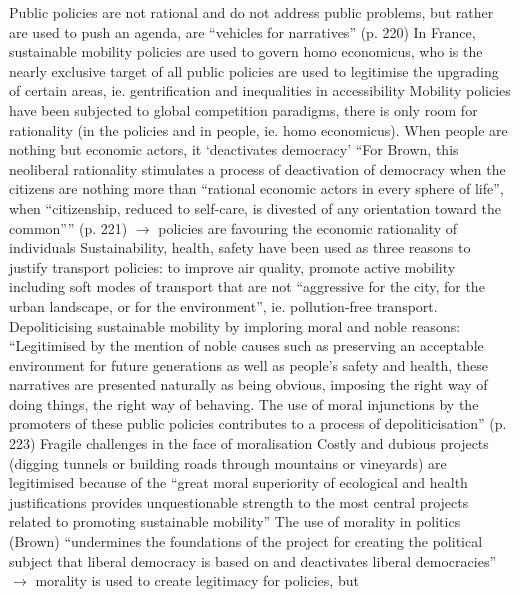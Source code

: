 \documentclass{article}
\begin{document}
\begin{outline}
	\1 Public policies are not rational and do not address public problems, but rather are used to push an agenda, are ``vehicles for narratives'' (p. 220)
	\1 In France, sustainable mobility policies
		\2 are used to govern homo economicus, who is the nearly exclusive target of all public policies
		\2 are used to legitimise the upgrading of certain areas, ie. gentrification and inequalities in accessibility 
	\1 Mobility policies have been subjected to global competition paradigms, there is only room for rationality (in the policies and in people, ie. homo economicus). When people are nothing but economic actors, it `deactivates democracy' 
		\2 ``For Brown, this neoliberal rationality stimulates a process of deactivation of democracy when the citizens are nothing more than ``rational economic actors in every sphere of life'', when ``citizenship, reduced to self-care, is divested of any orientation toward the common'''' (p. 221)
		\2 $\rightarrow$ policies are favouring the economic rationality of individuals
	\1 Sustainability, health, safety have been used as three reasons to justify transport policies: to improve air quality, promote active mobility including soft modes of transport that are not ``aggressive for the city, for the urban landscape, or for the environment'', ie. pollution-free transport.
		\2 Depoliticising sustainable mobility by imploring moral and noble reasons: ``Legitimised by the mention of noble causes such as preserving an acceptable environment for future generations as well as people's safety and health, these narratives are presented naturally as being obvious, imposing the right way of doing things, the right way of behaving. The use of moral injunctions by the promoters of these public policies contributes to a process of depoliticisation'' (p. 223)
	\1 Fragile challenges in the face of moralisation
		\2 Costly and dubious projects (digging tunnels or building roads through mountains or vineyards) are legitimised because of the ``great moral superiority of ecological and health justifications provides unquestionable strength to the most central projects related to promoting sustainable mobility''
	\1 The use of morality in politics (Brown) ``undermines the foundations of the project for creating the political subject that liberal democracy is based on and deactivates liberal democracies'' $\rightarrow$ morality is used to create legitimacy for policies, but 
\end{outline}


\end{document}
